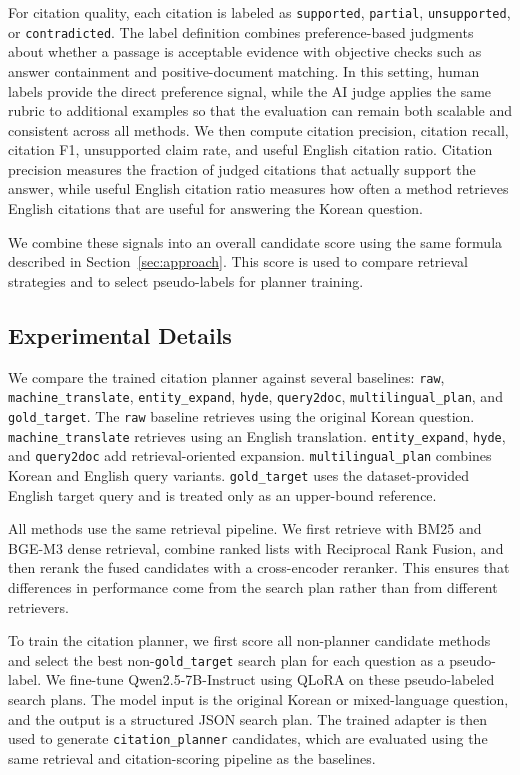\documentclass{article}
\begin{document}
For citation quality, each citation is labeled as \texttt{supported}, \texttt{partial}, \texttt{unsupported}, or \texttt{contradicted}. The label definition combines preference-based judgments about whether a passage is acceptable evidence with objective checks such as answer containment and positive-document matching. In this setting, human labels provide the direct preference signal, while the AI judge applies the same rubric to additional examples so that the evaluation can remain both scalable and consistent across all methods. We then compute citation precision, citation recall, citation F1, unsupported claim rate, and useful English citation ratio. Citation precision measures the fraction of judged citations that actually support the answer, while useful English citation ratio measures how often a method retrieves English citations that are useful for answering the Korean question.

We combine these signals into an overall candidate score using the same formula described in Section~\ref{sec:approach}. This score is used to compare retrieval strategies and to select pseudo-labels for planner training.

\subsection{Experimental Details}
\label{sec:experimental_details}

We compare the trained citation planner against several baselines: \texttt{raw}, \texttt{machine\_translate}, \texttt{entity\_expand}, \texttt{hyde}, \texttt{query2doc}, \texttt{multilingual\_plan}, and \texttt{gold\_target}. The \texttt{raw} baseline retrieves using the original Korean question. \texttt{machine\_translate} retrieves using an English translation. \texttt{entity\_expand}, \texttt{hyde}, and \texttt{query2doc} add retrieval-oriented expansion. \texttt{multilingual\_plan} combines Korean and English query variants. \texttt{gold\_target} uses the dataset-provided English target query and is treated only as an upper-bound reference.

All methods use the same retrieval pipeline. We first retrieve with BM25 and BGE-M3 dense retrieval, combine ranked lists with Reciprocal Rank Fusion, and then rerank the fused candidates with a cross-encoder reranker. This ensures that differences in performance come from the search plan rather than from different retrievers.

To train the citation planner, we first score all non-planner candidate methods and select the best non-\texttt{gold\_target} search plan for each question as a pseudo-label. We fine-tune Qwen2.5-7B-Instruct using QLoRA on these pseudo-labeled search plans. The model input is the original Korean or mixed-language question, and the output is a structured JSON search plan. The trained adapter is then used to generate \texttt{citation\_planner} candidates, which are evaluated using the same retrieval and citation-scoring pipeline as the baselines.
\end{document}
